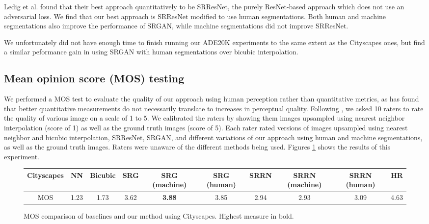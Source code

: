 \documentclass[10pt,twocolumn,letterpaper]{article}
\begin{document}
Ledig et al. \cite{SRGAN} found that their best approach quantitatively to be
SRResNet, the purely ResNet-based approach which does not use an adversarial
loss. We find that our best approach is SRResNet modified to use human
segmentations. Both human and machine segmentations also improve the
performance of SRGAN, while machine segmentations did not improve SRResNet.

We unfortunately did not have enough time to finish running our ADE20K
experiments to the same extent as the Cityscapes ones, but find a similar
peformance gain in using SRGAN with human segmentations over bicubic
interpolation.

\subsection{Mean opinion score (MOS) testing}
We performed a MOS test to evaluate the quality of our approach using human
perception rather than quantitative metrics, as \cite{SRGAN} has found that
better quantitative measurements do not necessarily translate to increases in
perceptual quality. Following \cite{SRGAN}, we asked 10 raters to rate the
quality of various image on a scale of 1 to 5. We calibrated the raters by
showing them images upsampled using nearest neighbor interpolation (score of 1)
as well as the ground truth images (score of 5). Each rater rated versions of
images upsampled using nearest neighbor and bicubic interpolation, SRResNet,
SRGAN, and different variations of our approach using human and machine
segmentations, as well as the ground truth images. Raters were unaware of the
different methods being used. Figures \ref{fig:mos} shows the results of this
experiment.

\begin{figure}[ht!]
    \begin{center}
        \small
        \begin{tabular}{c ccccccccc}
            \textbf{Cityscapes} & NN & Bicubic & SRG & SRG (machine) & SRG
            (human) & SRRN & SRRN (machine) & SRRN (human) & HR \\
            \hline
            MOS & 1.23 & 1.73 & 3.62 & \textbf{3.88} & 3.85 & 2.94 & 2.93 & 3.09 & 4.63
        \end{tabular}
    \end{center}
    \caption{MOS comparison of baselines and our method using Cityscapes. Highest
    measure in bold.}
    \label{fig:mos}
\end{figure}
\end{document}
